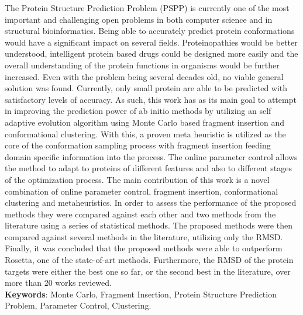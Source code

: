 \begin{resumo}
  The Protein Structure Prediction Problem (PSPP) is currently one of the
  most important and challenging open problems in both computer science and
  in structural bioinformatics. Being able to accurately predict protein
  conformations would have a significant impact on several fields.
  Proteinopathies would be better understood, intelligent protein based drugs
  could be designed more easily and the overall understanding of the protein
  functions in organisms would be further increased. Even with the problem being
  several decades old, no viable general solution was found. Currently, only
  small protein are able to be predicted with satisfactory levels of
  accuracy. As such, this work has as its main goal to attempt in improving the
  prediction power of ab initio methods by utilizing an self adaptive
  evolution algorithm using Monte Carlo based fragment insertion and
  conformational clustering. With this, a proven meta heuristic is utilized
  as the core of the conformation sampling process with fragment insertion
  feeding domain specific information into the process. The online parameter
  control allows the method to adapt to proteins of different features
  and also to different stages of the optimization process. The main
  contribution of this work is a novel combination of online parameter
  control, fragment insertion, conformational clustering and metaheuristics.
  In order to assess the performance of the proposed methods they were
  compared against each other and two methods from the literature using
  a series of statistical methods. The proposed methods were then compared
  against several methods in the literature, utilizing only the RMSD. 
  Finally, it was
  concluded that the proposed methods were able to outperform Rosetta, one of
  the state-of-art methods. Furthermore, the RMSD of the protein targets were
  either the best one so far, or the second best in the literature, over more
  than 20 works reviewed.
  \\
  \vspace{\onelineskip}
  \noindent
  \textbf{Keywords}: Monte Carlo, Fragment Insertion, Protein Structure Prediction Problem, Parameter Control, Clustering.
\end{resumo}


